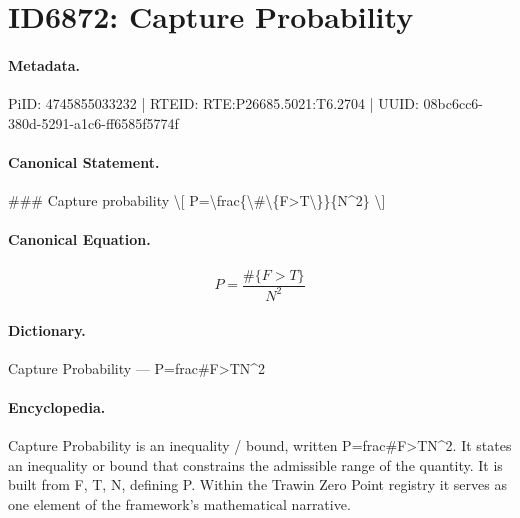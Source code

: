 \section*{ID6872: Capture Probability}
\paragraph{Metadata.}
PiID: 4745855033232 | RTEID: RTE:P26685.5021:T6.2704 | UUID: 08bc6cc6-380d-5291-a1c6-ff6585f5774f

\paragraph{Canonical Statement.}
\#\#\# Capture probability \textbackslash{}[ P=\textbackslash{}frac\{\textbackslash{}\#\textbackslash{}\{F>T\textbackslash{}\}\}\{N\textasciicircum{}2\} \textbackslash{}]

\paragraph{Canonical Equation.}
\[
P=\frac{\#\{F>T\}}{N^2}
\]

\paragraph{Dictionary.}
Capture Probability — P=frac\#F>TN\textasciicircum{}2

\paragraph{Encyclopedia.}
Capture Probability is an inequality / bound, written P=frac\#F>TN\textasciicircum{}2. It states an inequality or bound that constrains the admissible range of the quantity. It is built from F, T, N, defining P. Within the Trawin Zero Point registry it serves as one element of the framework's mathematical narrative.
